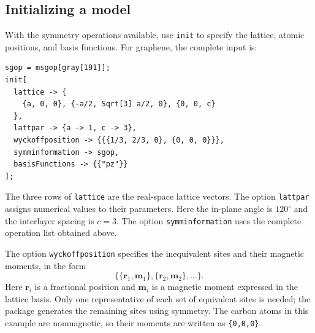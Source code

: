 \documentclass[titlepage,a4paper,12pt]{article}
\begin{document}
\subsection{Initializing a model}
\label{sec:init}
With the symmetry operations available, use \lstinline|init| to specify the
lattice, atomic positions, and basis functions. For graphene, the complete
input is:
\begin{lstlisting}
sgop = msgop[gray[191]];
init[
  lattice -> {
    {a, 0, 0}, {-a/2, Sqrt[3] a/2, 0}, {0, 0, c}
  },
  lattpar -> {a -> 1, c -> 3},
  wyckoffposition -> {{{1/3, 2/3, 0}, {0, 0, 0}}},
  symminformation -> sgop,
  basisFunctions -> {{"pz"}}
];
\end{lstlisting}
The three rows of \lstinline|lattice| are the real-space lattice vectors.
The option \lstinline|lattpar| assigns numerical values to their parameters.
Here the in-plane angle is $120^\circ$ and the interlayer spacing is $c=3$.
The option \lstinline|symminformation| uses the complete operation list obtained
above.

The option \lstinline|wyckoffposition| specifies the inequivalent sites and
their magnetic moments, in the form
\[
\{\{\boldsymbol r_1,\boldsymbol m_1\},
  \{\boldsymbol r_2,\boldsymbol m_2\},\ldots\}.
\]
Here $\boldsymbol r_i$ is a fractional position and $\boldsymbol m_i$ is a
magnetic moment expressed in the lattice basis. Only one representative of
each set of equivalent sites is needed; the package generates the remaining
sites using symmetry. The carbon atoms in this example are nonmagnetic, so
their moments are written as \lstinline|{0,0,0}|.
\end{document}
